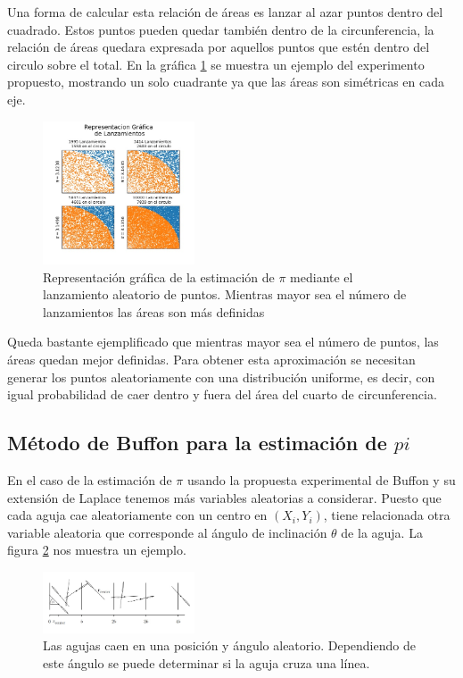 \documentclass{rbf}
\begin{document}
Una forma de calcular esta relación de áreas es lanzar al azar puntos dentro del cuadrado. Estos puntos pueden quedar también dentro de la circunferencia, la relación de áreas quedara expresada por aquellos puntos que estén dentro del circulo sobre el total.
En la gráfica \ref{area} se muestra un ejemplo del experimento propuesto, mostrando un solo cuadrante ya que las áreas son simétricas en cada eje.

\begin{figure}[htbp!]
 \centering
  \includegraphics[width=0.4\textwidth]{figures/areas.jpg}
	\caption{Representación gráfica de la estimación de $\pi$ mediante el lanzamiento aleatorio de puntos. Mientras mayor sea el número de lanzamientos las áreas son más definidas}
 \label{area}
\end{figure}

Queda bastante ejemplificado que mientras mayor sea el número de puntos, las áreas quedan mejor definidas.
Para obtener esta aproximación se necesitan generar los puntos aleatoriamente con una distribución uniforme, es decir, con igual probabilidad de caer dentro y fuera del área del cuarto de circunferencia.

\subsection{Método de Buffon para la estimación de $pi$}

En el caso de la estimación de $\pi$ usando la propuesta experimental de Buffon y su extensión de Laplace tenemos más variables aleatorias a considerar. Puesto que cada aguja cae aleatoriamente con un centro en $(X_i,Y_i)$, tiene relacionada otra variable aleatoria que corresponde al ángulo de inclinación $\theta$ de la aguja. La figura \ref{aguja} nos muestra un ejemplo.



\begin{figure}[tbp!]
 \centering
  \includegraphics[width=0.4\textwidth]{figures/agujas.jpg}
	\caption{Las agujas caen en una posición y ángulo aleatorio. Dependiendo de este ángulo se puede determinar si la aguja cruza una línea.\cite{Statistics}}
 \label{aguja}
\end{figure}
\end{document}
